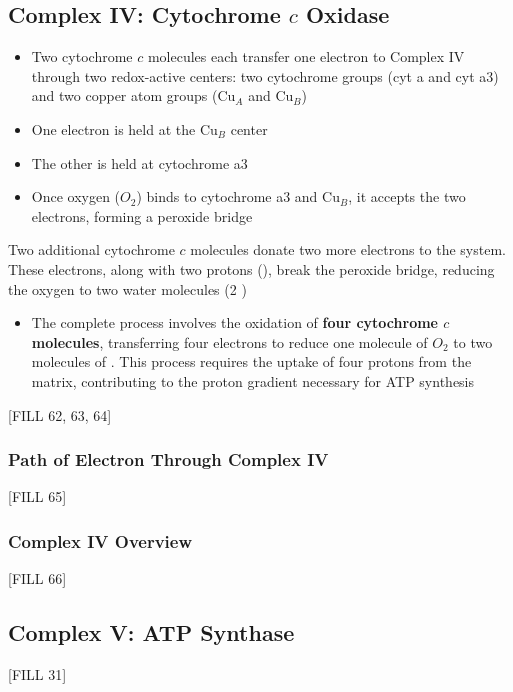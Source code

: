 \documentclass[10pt]{article}
\newcommand{\water}{\text{H$_2$O}}
\newcommand{\proton}{\text{H$^+$}}
\begin{document}
\subsection*{Complex IV: Cytochrome $c$ Oxidase}
\begin{itemize}
	\item Two cytochrome $c$ molecules each transfer one electron to Complex IV through two redox-active centers: two cytochrome groups (cyt a and cyt a3) and two copper atom groups (Cu$_A$ and Cu$_B$)
	\item One electron is held at the Cu$_B$ center
	\item The other is held at cytochrome a3
	\item Once oxygen ($O_2$) binds to cytochrome a3 and Cu$_B$, it accepts the two electrons, forming a peroxide bridge
\end{itemize}
Two additional cytochrome $c$ molecules donate two more electrons to the system.  These electrons, along with two protons (\proton), break the peroxide bridge, reducing the oxygen to two water molecules (2 \water)
\begin{itemize}
	\item The complete process involves the oxidation of \textbf{four cytochrome $c$ molecules}, transferring four electrons to reduce one molecule of $O_2$ to two molecules of \water.  This process requires the uptake of four protons from the matrix, contributing to the proton gradient necessary for ATP synthesis
\end{itemize}
\begin{center} 
	[FILL 62, 63, 64]
\end{center}

\subsubsection*{Path of Electron Through Complex IV}
\begin{center} 
	[FILL 65]
\end{center}

\subsubsection*{Complex IV Overview}
\begin{center} 
	[FILL 66]
\end{center}

\subsection*{Complex V: ATP Synthase}
\begin{center} 
	[FILL 31]
\end{center}
\end{document}

